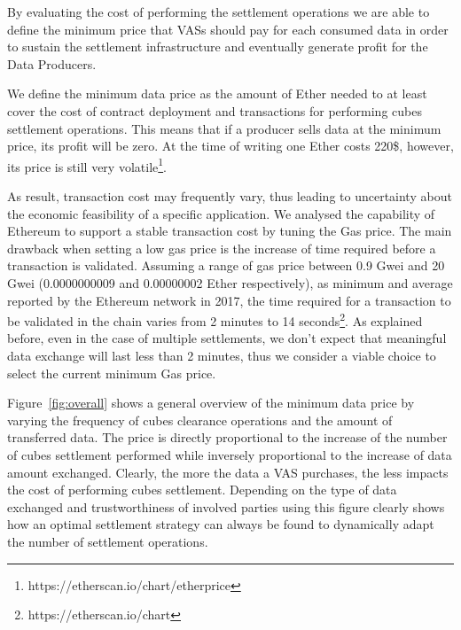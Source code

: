 By evaluating the cost of performing the settlement operations we are able to define the minimum price that VASs should pay for each consumed data in order to sustain the settlement infrastructure and eventually generate profit for the Data Producers.

We define the minimum data price as the amount of Ether needed to at least cover the cost of contract deployment and transactions for performing cubes settlement operations. This means that if a producer sells data at the minimum price, its profit will be zero. 
At the time of writing one Ether costs 220\$, however, its price is still very volatile\footnote{https://etherscan.io/chart/etherprice}.

As result, transaction cost may frequently vary, thus leading to uncertainty about the economic feasibility of a specific application. We analysed the capability of Ethereum to support a stable transaction cost by tuning the Gas price. The main drawback when setting a low gas price is the increase of time required before a transaction is validated. Assuming a range of gas price between 0.9 Gwei and 20 Gwei (0.0000000009 and 0.00000002 Ether respectively), as minimum and average reported by the Ethereum network in 2017, the time required for a transaction to be validated in the chain varies from 2 minutes to 14 seconds\footnote{https://etherscan.io/chart}. As explained before, even in the case of multiple settlements, we don’t expect that meaningful data exchange will last less than 2 minutes, thus we consider a viable choice to select the current minimum Gas price.


Figure~\ref{fig:overall} shows a general overview of the minimum data price by varying the frequency of cubes clearance operations and the amount of transferred data. The price is directly proportional to the increase of the number of cubes settlement performed while inversely proportional to the increase of data amount exchanged. Clearly, the more the data a VAS purchases, the less impacts the cost of performing cubes settlement. Depending on the type of data exchanged and trustworthiness of involved parties using this figure clearly shows how an optimal settlement strategy can always be found to dynamically adapt the number of settlement operations.

